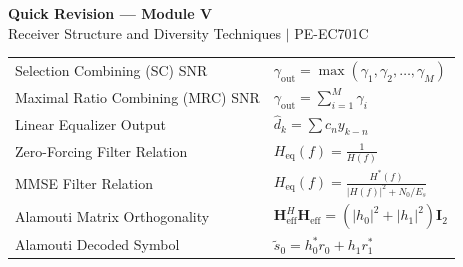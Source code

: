 \documentclass[12pt,a4paper]{article}
\renewcommand{\arraystretch}{1.45}
\begin{document}
\newpage
\begin{center}
  {\large\bfseries\color{myred} Quick Revision --- Module V}\\[3pt]
  {\small\color{mydark} Receiver Structure and Diversity Techniques $|$ PE-EC701C}
\end{center}
\noindent{\color{myred}\rule{\linewidth}{1.2pt}}
\vspace{4pt}

\begin{tcolorbox}[formulabox, title={\textbf{Key Formulas at a Glance}}]
\renewcommand{\arraystretch}{1.3}
\begin{tabularx}{\linewidth}{B{5.5cm} X}Selection Combining (SC) SNR & $\gamma_{\text{out}} = \max(\gamma_1, \gamma_2, \dots, \gamma_M)$ \\
Maximal Ratio Combining (MRC) SNR & $\gamma_{\text{out}} = \sum_{i=1}^{M} \gamma_i$ \\
Linear Equalizer Output & $\hat{d}_k = \sum c_n y_{k-n}$ \\
Zero-Forcing Filter Relation & $H_{\text{eq}}(f) = \frac{1}{H(f)}$ \\
MMSE Filter Relation & $H_{\text{eq}}(f) = \frac{H^*(f)}{|H(f)|^2 + N_0/E_s}$ \\
Alamouti Matrix Orthogonality & $\mathbf{H}_{\text{eff}}^H \mathbf{H}_{\text{eff}} = \left( |h_0|^2 + |h_1|^2 \right) \mathbf{I}_2$ \\
Alamouti Decoded Symbol & $\tilde{s}_0 = h_0^* r_0 + h_1 r_1^*$
\end{tabularx}
\end{tcolorbox}
\end{document}
